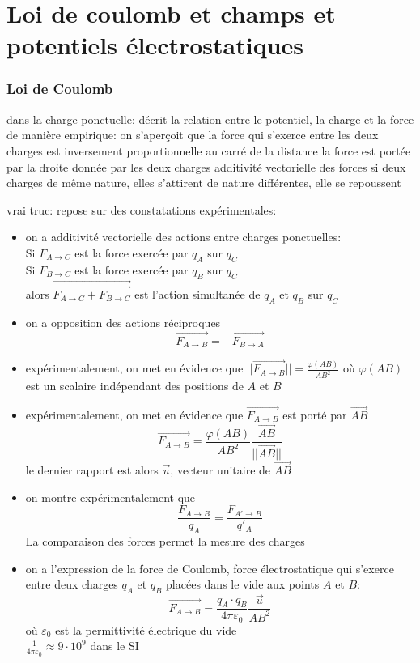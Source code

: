 \documentclass[../main.tex]{subfile}
\begin{document}
\part{Loi de coulomb et champs et potentiels électrostatiques}
\section{Loi de Coulomb}
dans la charge ponctuelle:
décrit la relation entre le potentiel, la charge et la force
de manière empirique: on s'aperçoit que 
la force qui s'exerce entre les deux charges est inversement proportionnelle au carré de la distance
la force est portée par la droite donnée par les deux charges
additivité vectorielle des forces
si deux charges de même nature, elles s'attirent
de nature différentes, elle se repoussent

vrai truc:
repose sur des constatations expérimentales:
\begin{itemize}
	\item on a additivité vectorielle des actions entre charges ponctuelles:\\
	Si $F_{A \to C}$ est la force exercée par $q_A$ sur $q_C$\\
	Si $F_{B \to C}$ est la force exercée par $q_B$ sur $q_C$\\
	alors $\vec{F_{A \to C} + \vec{F_{B \to C}}}$ est l'action simultanée de $q_A$ et $q_B$ sur $q_C$
	\item on a opposition des actions réciproques
	$$\vec{F_{A \to B}} = -\vec{F_{B \to A}}$$
	\item expérimentalement, on met en évidence que $||\vec{F_{A \to B}}|| = \frac{\varphi(AB)}{AB^2}$ où $\varphi(AB)$ est un scalaire indépendant des positions de $A$ et $B$
	\item expérimentalement, on met en évidence que $\vec{F_{A \to B}}$ est porté par $\vec{AB}$
	$$\vec{F_{A \to B}} = \frac{\varphi(AB)}{AB^2} \frac{\vec{AB}}{||\vec{AB}||}$$
	le dernier rapport est alors $\vec{u}$, vecteur unitaire de $\vec{AB}$
	\item on montre expérimentalement que 
	$$\frac{F_{A \to B}}{q_A} = \frac{F_{A' \to B}}{q'_A}$$
	La comparaison des forces permet la mesure des charges
	\item on a l'expression de la force de Coulomb, force électrostatique qui s'exerce entre deux charges $q_A$ et $q_B$ placées dans le vide aux points $A$ et $B$:
	$$\vec{F_{A \to B}} = \frac{q_A \cdot q_B}{4 \pi \varepsilon_0} \frac{\vec{u}}{AB^2}$$
	où $\varepsilon_0$ est la permittivité électrique du vide\\
	$\frac{1}{4 \pi \varepsilon_0} \approx 9\cdot 10^9$ dans le SI
\end{itemize}
\end{document}
